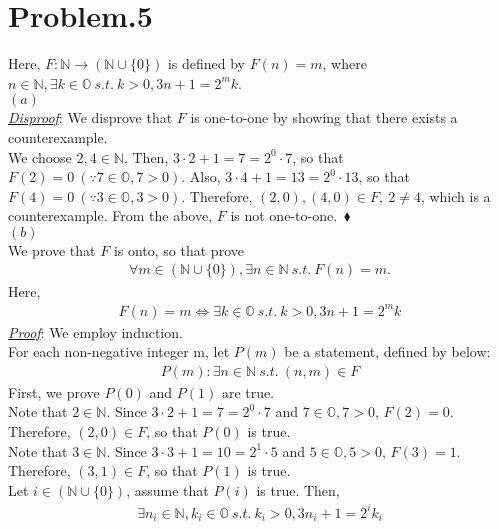 \documentclass[12pt]{article}
\begin{document}
\section*{Problem.5}
Here, $F: \mathbb{N} \longrightarrow (\mathbb{N} \cup \{0\})$ is defined by $F(n) = m$, where $n \in \mathbb{N}, \exists k \in \mathbb{O} ~s.t.~ k > 0,3n + 1 = 2^m k$.\\[1em]
$(a)$\\
\underline{\textit{Disproof}}: We disprove that $F$ is one-to-one by showing that there exists a counterexample.\\[1em]
We choose $2, 4 \in \mathbb{N}$. Then, $3 \cdot 2 + 1 = 7 = 2^0 \cdot 7$, so that $F(2) = 0 ~\left(\because 7 \in \mathbb{O}, 7 > 0\right)$. Also, $3 \cdot 4 + 1 = 13 = 2^0 \cdot 13$, so that $F(4) = 0 ~\left(\because 3 \in \mathbb{O}, 3 > 0\right)$. Therefore, $(2,0),(4,0) \in F,~2 \neq 4$, which is a counterexample.
From the above, $F$ is not one-to-one.~$\blacklozenge$\\[1em]
$(b)$\\
We prove that $F$ is onto, so that prove
\begin{gather*}
\forall m \in (\mathbb{N} \cup \{0\}), \exists n \in \mathbb{N} ~s.t.~ F(n) = m.
\end{gather*}
Here,
\begin{gather*}
F(n) = m \Leftrightarrow \exists k \in \mathbb{O} ~s.t.~ k > 0,3n + 1 = 2^m k
\end{gather*}
\underline{\textit{Proof}}: We employ induction.\\[1em]
For each non-negative integer m, let $P(m)$ be a statement, defined by below:
\begin{gather*}
P(m): \exists n \in \mathbb{N} ~s.t.~ (n,m) \in F
\end{gather*}
First, we prove $P(0)$ and $P(1)$ are true.\\[1em]
Note that $2 \in \mathbb{N}$. Since $3 \cdot 2 + 1 = 7 = 2^0 \cdot 7$ and $7 \in \mathbb{O}, 7 > 0$, $F(2) = 0$. Therefore, $(2,0) \in F$, so that $P(0)$ is true.\\[1em]
Note that $3 \in \mathbb{N}$. Since $3 \cdot 3 + 1 = 10 = 2^1 \cdot 5$ and $5 \in \mathbb{O}, 5 > 0$, $F(3) = 1$. Therefore, $(3,1) \in F$, so that $P(1)$ is true.\\[1em]
Let $i \in (\mathbb{N} \cup \{0\})$, assume that $P(i)$ is true.
Then,
\begin{gather*}
\exists n_i \in \mathbb{N}, k_i \in \mathbb{O}~s.t.~ k_i > 0, 3n_i + 1 = 2^i k_i
\end{gather*}
\end{document}
